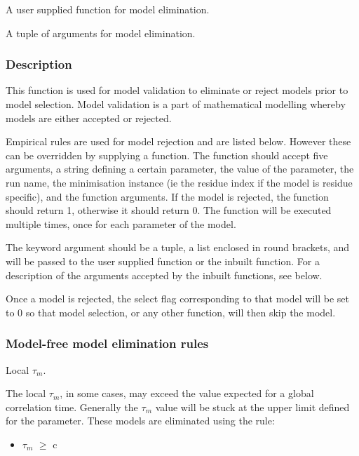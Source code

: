   A user supplied function for model elimination.  

  A tuple of arguments for model elimination.  

\subsubsection{Description}

This function is used for model validation to eliminate or reject models prior to model
selection.  Model validation is a part of mathematical modelling  whereby models are either
accepted or rejected.

Empirical rules are used for model rejection and are listed below.  However these can be
overridden by supplying a function.  The function should accept five arguments, a string
defining a certain parameter, the value of the parameter, the run name, the minimisation 
instance (ie the residue index if the model is residue specific), and the function
arguments.  If the model is rejected, the function should return 1, otherwise it should
return 0.  The function will be executed multiple times, once for each parameter of the
model.

The 
 keyword argument should be a tuple, a list enclosed in round brackets, and will
be passed to the user supplied function or the inbuilt function.  For a description of the
arguments accepted by the inbuilt functions, see below.

Once a model is rejected, the select flag corresponding to that model will be set to 0 so
that model selection, or any other function, will then skip the model.



\subsubsection{Model-free model elimination rules}

Local $\tau_m$.

The local $\tau_m$, in some cases, may exceed the value expected for a global correlation time. 
Generally the $\tau_m$ value will be stuck at the upper limit  defined for the parameter.  These
models are eliminated using the rule:

\begin{itemize}
\item[]     $\tau_m$ $\ge$ c
\end{itemize}

